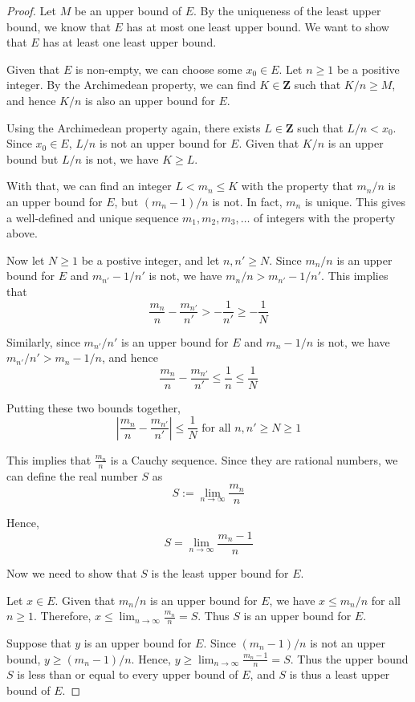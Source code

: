 \documentclass[tikz,12pt,a4paper]{article}
\theoremstyle{definition}
\begin{document}
\begin{proof}
  Let $M$ be an upper bound of $E$. By the uniqueness of the least upper bound, we know that $E$ has at most one least upper bound. We want to show that $E$ has at least one least upper bound.

  Given that $E$ is non-empty, we can choose some $x_0 \in E$. Let $n \geq 1$ be a positive integer. By the Archimedean property, we can find $K \in \textbf{Z}$ such that $K/n \geq M$, and hence $K/n$ is also an upper bound for $E$.
  
  Using the Archimedean property again, there exists $L \in \textbf{Z}$ such that $L/n < x_0$. Since $x_0 \in E$, $L/n$ is not an upper bound for $E$. Given that $K/n$ is an upper bound but $L/n$ is not, we have $K \geq L$. 

  With that, we can find an integer $L < m_n \leq K$ with the property that $m_n / n$ is an upper bound for $E$, but $(m_n-1)/n$ is not. In fact, $m_n$ is unique. This gives a well-defined and unique sequence $m_1, m_2, m_3, \ldots$ of integers with the property above. 

  Now let $N \geq 1$ be a postive integer, and let $n, n' \geq N$. Since $m_n/n$ is an upper bound for $E$ and $m_{n'}-1/n'$ is not, we have $m_n/n > m_{n'}-1/n'$. This implies that 
  \[
    \frac{m_n}{n} - \frac{m_{n'}}{n'} > - \frac{1}{n'} \geq - \frac{1}{N}
  \]

  Similarly, since $m_{n'}/n'$ is an upper bound for $E$ and $m_{n}-1/n$ is not, we have $m_{n'}/n' > m_{n}-1/n$, and hence
  \[
    \frac{m_n}{n} - \frac{m_{n'}}{n'} \leq \frac{1}{n} \leq \frac{1}{N}
  \]

  Putting these two bounds together,
  \[
    \left| \frac{m_n}{n} - \frac{m_{n'}}{n'} \right | \leq \frac{1}{N} \text{ for all } n,n' \geq N \geq 1
  \]

  This implies that $\frac{m_n}{n}$ is a Cauchy sequence. Since they are rational numbers, we can define the real number $S$ as
  \[
    S := \lim_{n \to \infty} \frac{m_n}{n}
  \]

  Hence,
  \[
    S = \lim_{n \to \infty} \frac{m_n - 1}{n}
  \]

  Now we need to show that $S$ is the least upper bound for $E$.

  Let $x \in E$. Given that $m_n/n$ is an upper bound for $E$, we have $x \leq m_n/n$ for all $n \geq 1$. Therefore, $x \leq \lim_{n \to \infty} \frac{m_n}{n} = S$. Thus $S$ is an upper bound for $E$.

  Suppose that $y$ is an upper bound for $E$. Since $(m_n - 1)/n$ is not an upper bound, $y \geq (m_n - 1)/n$. Hence, $y \geq \lim_{n \to \infty} \frac{m_n - 1}{n} = S$. Thus the upper bound $S$ is less than or equal to every upper bound of $E$, and $S$ is thus a least upper bound of $E$. 
\end{proof}
\end{document}
